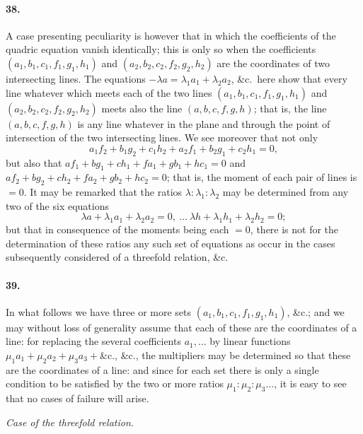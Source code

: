 \documentclass[11pt,a4paper]{article}
\begin{document}
\paragraph{38.}
A case presenting peculiarity is however that in which the coefficients of the
quadric equation vanish identically; this is only so when the coefficients
$(a_1, b_1, c_1, f_1, g_1, h_1)$ and $(a_2, b_2, c_2, f_2, g_2, h_2)$ are the coordinates of two
intersecting lines. The equations $-\lambda a = \lambda_1 a_1 + \lambda_2 a_2$, \&c.\ here show that every
line whatever which meets each of the two lines $(a_1, b_1, c_1, f_1, g_1, h_1)$ and
$(a_2, b_2, c_2, f_2, g_2, h_2)$ meets also the line $(a,b,c,f,g,h)$; that is, the line
$(a,b,c,f,g,h)$ is any line whatever in the plane and through the point of intersection
of the two intersecting lines. We see moreover that not only
\[
a_1 f_2 + b_1 g_2 + c_1 h_2 + a_2 f_1 + b_2 g_1 + c_2 h_1 = 0,
\]
but also that $a f_1 + b g_1 + c h_1 + f a_1 + g b_1 + h c_1 = 0$ and
$a f_2 + b g_2 + c h_2 + f a_2 + g b_2 + h c_2 = 0$;
that is, the moment of each pair of lines is $=0$. It may be remarked that the ratios
$\lambda : \lambda_1 : \lambda_2$ may be determined from any two of the six equations
\[
\lambda a + \lambda_1 a_1 + \lambda_2 a_2 = 0,\ \ldots\ \lambda h + \lambda_1 h_1 + \lambda_2 h_2 = 0;
\]
but that in consequence of the moments being each $=0$, there is not for the
determination of these ratios any such set of equations as occur in the cases
subsequently considered of a threefold relation, \&c.

\paragraph{39.}
In what follows we have three or more sets $(a_1, b_1, c_1, f_1, g_1, h_1)$, \&c.; and
we may without loss of generality assume that each of these are the coordinates of a
line: for replacing the several coefficients $a_1, \ldots$ by linear functions
$\mu_1 a_1 + \mu_2 a_2 + \mu_3 a_3 +{}$\&c., \&c., the multipliers may be determined so that
these are the coordinates of a line: and since for each set there is only a single
condition to be satisfied by the two or more ratios $\mu_1 : \mu_2 : \mu_3 \ldots$, it is easy to
see that no cases of failure will arise.

\bigskip
\begin{center}
\textit{Case of the threefold relation.}
\end{center}
\end{document}
